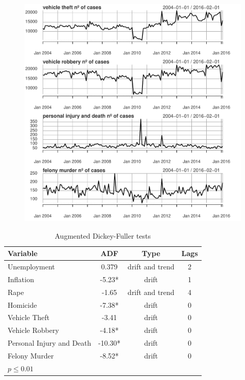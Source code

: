\documentclass[11pt, a4paper]{article}
\begin{document}
\begin{figure}[H]
\caption{}
\centering
\includegraphics[width=15cm]{graph2}
\label{fig:2}
\end{figure}





\begin{table}[H]
\centering 
\caption{Augmented Dickey-Fuller tests}
\label{tab:adf.tests}
\begin{tabular}{l c c c}\hline\hline
\textbf{Variable} & \textbf{ADF}
 & \textbf{Type}& \textbf{Lags} \\ \hline

Unemployment & 0.379 & drift and trend  & 2 \\
Inflation & -5.23* & drift & 1 \\
Rape & -1.65 & drift and trend & 4 \\
Homicide & -7.38* & drift & 0 \\
Vehicle Theft & -3.41   & drift   &  0 \\
Vehicle Robbery & -4.18* & drift  &  0 \\
Personal Injury and Death & -10.30*  & drift   & 0  \\
Felony Murder & -8.52*   & drift    & 0   \\
\hline\hline
\multicolumn{4}{l}{\footnotesize *  $p \leq 0.01$}\\
\end{tabular}
\end{table}
\end{document}
